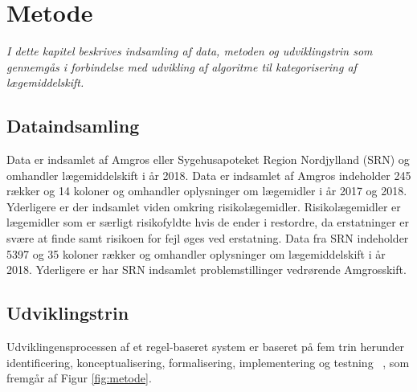 \chapter{Metode}
\textit{I dette kapitel beskrives indsamling af data, metoden og udviklingstrin som gennemgås i forbindelse med udvikling af algoritme til kategorisering af  lægemiddelskift.}

\section{Dataindsamling}
Data er indsamlet af Amgros eller Sygehusapoteket Region Nordjylland (SRN) og omhandler lægemiddelskift i år 2018. Data er indsamlet af Amgros indeholder 245 rækker og 14 koloner og omhandler oplysninger om lægemidler i år 2017 og 2018. Yderligere er der indsamlet viden omkring risikolægemidler. Risikolægemidler er lægemidler som er særligt risikofyldte hvis de ender i restordre, da erstatninger er svære at finde samt risikoen for fejl øges ved erstatning. Data fra SRN indeholder 5397 og 35 koloner rækker og omhandler oplysninger om lægemiddelskift i år 2018. Yderligere er har SRN indsamlet problemstillinger vedrørende Amgrosskift. 

\section{Udviklingstrin}
Udviklingensprocessen af et regel-baseret system er baseret på fem trin herunder identificering, konceptualisering, formalisering, implementering og testning ~\citep{Ligeza2006}, som fremgår af Figur \ref{fig:metode}.  

